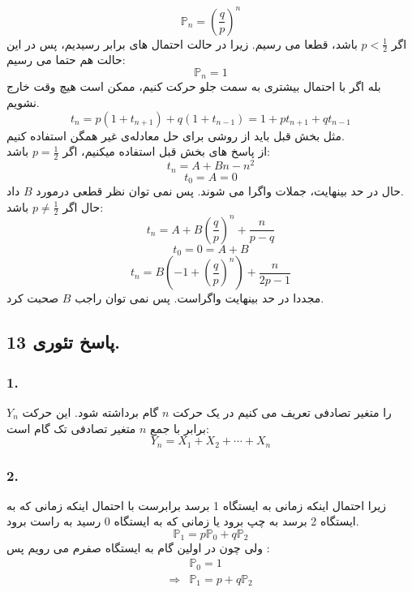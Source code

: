 \documentclass[]{article}
\begin{document}
\begin{equation}
	\nonumber
	\mathbb{P}_n = (\frac{q}{p})^n
\end{equation}
اگر
$p<\frac{1}{2}$
باشد، قطعا می رسیم. زیرا در حالت احتمال های برابر رسیدیم، پس در این حالت هم حتما می رسیم:
\begin{equation}
	\nonumber
	\mathbb{P}_n = 1
\end{equation}
بله اگر با احتمال بیشتری به سمت جلو حرکت کنیم، ممکن است هیچ وقت خارج نشویم.
\begin{equation}
	\nonumber
	t_n = p(1+t_{n+1})+q(1+t_{n-1}) = 1+p t_{n+1}+qt_{n-1}
\end{equation}
مثل بخش قبل باید از روشی برای حل معادله‌ی غیر همگن استفاده کنیم.\\
از پاسخ های بخش قبل استفاده میکنیم، اگر
$p=\frac{1}{2}$
باشد:
\begin{equation}
	\nonumber
	t_n = A+Bn - n^2
\end{equation}
\begin{equation}
	\nonumber
	t_0 = A = 0
\end{equation}
حال در حد بینهایت، جملات واگرا می شوند. پس نمی توان نظر قطعی درمورد 
$B$
داد.\\
حال اگر 
$p\neq \frac{1}{2}$
باشد:
\begin{equation}
	\nonumber
	t_n= A+B(\frac{q}{p})^n+\frac{n}{p-q} 
\end{equation}
\begin{equation}
	\nonumber
	t_0= 0 =A+B
\end{equation}
\begin{equation}
	\nonumber
	t_n = B(-1 + (\frac{q}{p})^n) + \frac{n}{2p-1}
\end{equation}
مجددا در حد بینهایت واگراست. پس نمی توان راجب 
$B$
 صحبت کرد.
\newpage
\subsection{پاسخ تئوری 13.}	
\subsubsection{1.}
$Y_n$ را متغیر تصادفی تعریف می کنیم در یک حرکت $n$ گام برداشته شود. این حرکت برابر با جمع $n$ متغیر تصادفی تک گام است:
\begin{equation}
	\nonumber
	Y_n = X_1 + X_2 + \cdots + X_n
\end{equation}
\subsubsection{2.}
زیرا احتمال اینکه زمانی به ایستگاه 1 برسد برابرست با احتمال اینکه زمانی که به ایستگاه 2 برسد به چپ برود یا زمانی که به ایستگاه 0 رسید به راست برود.
\begin{equation}
	\nonumber
	\mathbb{P}_1 = p \mathbb{P}_0 + q \mathbb{P}_2
\end{equation}
ولی چون در اولین گام به ایستگاه صفرم می رویم پس :
\begin{equation}
	\nonumber
	\begin{split}
		&\mathbb{P}_0 = 1\\
		\Rightarrow &\mathbb{P}_1 = p + q \mathbb{P}_2
	\end{split}
\end{equation}
\end{document}

